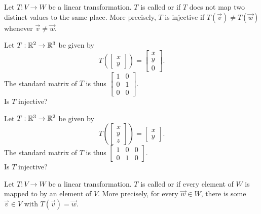 


\begin{applicationActivities}

\begin{definition}
Let $T: V \rightarrow W$ be a linear transformation.
$T$ is called  or  if $T$ does not map two distinct values to the same place.  More precisely, $T$ is injective if $T(\vec{v}) \neq T(\vec{w})$ whenever $\vec{v} \neq \vec{w}$.
\end{definition}

\begin{activity}{5}
Let $T: \mathbb{R}^2 \rightarrow \mathbb{R}^3$ be given by $$T\left(\begin{bmatrix}x \\ y \end{bmatrix} \right) = \begin{bmatrix} x \\ y \\ 0 \end{bmatrix}.$$
The standard matrix of $T$ is thus $\begin{bmatrix} 1 & 0 \\ 0 & 1 \\ 0 & 0 \end{bmatrix}$. \\
Is $T$ injective?
\end{activity}

\begin{activity}{5}
Let $T: \mathbb{R}^3 \rightarrow \mathbb{R}^2$ be given by $$T\left(\begin{bmatrix} x \\ y \\ z \end{bmatrix} \right) = \begin{bmatrix} x \\ y \end{bmatrix}.$$  The standard matrix of $T$ is thus $\begin{bmatrix} 1 & 0 &0  \\ 0 & 1 & 0 \end{bmatrix}$.\\
Is $T$ injective?
\end{activity}

\begin{definition}
Let $T: V \rightarrow W$ be a linear transformation.
$T$ is called  or  if every element of $W$ is mapped to by an element of $V$.  More precisely, for every $\vec{w} \in W$, there is some $\vec{v} \in V$ with $T(\vec{v})=\vec{w}$.
\end{definition}


\end{applicationActivities}
